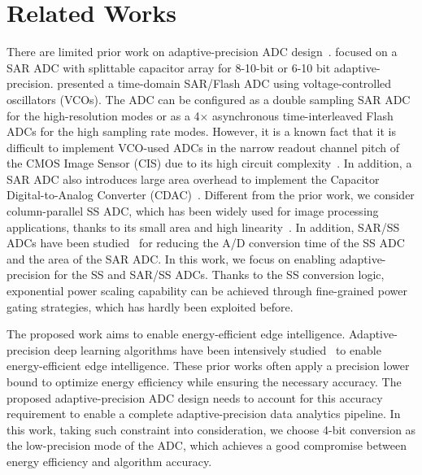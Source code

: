 \section{Related Works}\label{related}

There are limited prior work on adaptive-precision ADC design~\cite{zhu_06_2013,zhu_6--10-bit_2015,yip_resolution-reconfigurable_2013,el-halwagy_100-mss5-gss_2018}. 
\cite{zhu_06_2013,yip_resolution-reconfigurable_2013,zhu_6--10-bit_2015} focused on a SAR ADC with splittable capacitor array for 8-10-bit or 6-10 bit adaptive-precision. 
\cite{el-halwagy_100-mss5-gss_2018} presented a time-domain SAR/Flash ADC using voltage-controlled oscillators (VCOs). The ADC can be configured as a double sampling SAR ADC for the high-resolution modes or as a 4× asynchronous time-interleaved Flash ADCs for the high sampling rate modes.
However, it is a known fact that it is difficult to implement VCO-used ADCs in the narrow readout channel pitch of the CMOS Image Sensor (CIS) due to its high circuit complexity~\cite{kim_area-efficient_2016}. In addition, a SAR ADC also introduces large area overhead to implement the Capacitor Digital-to-Analog Converter (CDAC)~\cite{funatsu_62_2015}.
Different from the prior work, we consider column-parallel SS ADC, which has been widely used for image processing applications, 
thanks to its small area and high linearity~\cite{kim_11-bit_2021,nie_single_2020,kumagai_14-inch_2018,park_640_2020}. 
In addition, SAR/SS ADCs have been studied~\cite{kim_area-efficient_2016,chen_12_2014} for reducing the A/D conversion time of 
the SS ADC and the area of the SAR ADC.     
In this work, we focus on enabling adaptive-precision for the SS and SAR/SS ADCs. Thanks to the SS conversion logic, exponential power 
scaling capability can be achieved through fine-grained power gating strategies, which has hardly been exploited before.


The proposed work aims to enable energy-efficient edge intelligence.  Adaptive-precision deep learning algorithms have been intensively studied~\cite{leibe_xnor-net_2016,li_ternary_2016,park_energy-efficient_2018} to enable energy-efficient edge intelligence. These prior works often apply a precision lower bound to optimize energy efficiency while ensuring the necessary accuracy.  The proposed adaptive-precision ADC design needs to account for this accuracy requirement to enable a complete adaptive-precision data analytics pipeline. In this work, taking such constraint into consideration, we choose 4-bit conversion as the low-precision mode of the ADC, which achieves a good compromise between energy efficiency and algorithm accuracy. 

